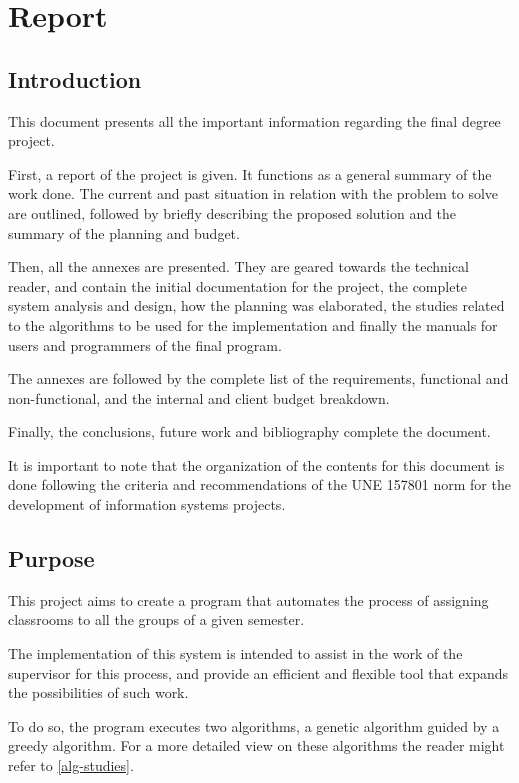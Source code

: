 \renewcommand{\documentname}{Report}

\chapter{Report}

\section{Introduction}

This document presents all the important information regarding the \tfg final degree project.

First, a report of the project is given. It functions as a general summary of the work done. The current and past situation in relation with the problem to solve are outlined, followed by briefly describing the proposed solution and the summary of the planning and budget.

Then, all the annexes are presented. They are geared towards the technical reader, and contain the initial documentation for the project, the complete system analysis and design, how the planning was elaborated, the studies related to the algorithms to be used for the implementation and finally the manuals for users and programmers of the final program.

The annexes are followed by the complete list of the requirements, functional and non-functional, and the internal and client budget breakdown.

Finally, the conclusions, future work and bibliography complete the document.

It is important to note that the organization of the contents for this document is done following the criteria and recommendations of the UNE 157801 norm for the development of information systems projects.

\section{Purpose}

This project aims to create a program that automates the process of assigning classrooms to all the groups of a given semester.

The implementation of this system is intended to assist in the work of the supervisor for this process, and provide an efficient and flexible tool that expands the possibilities of such work.

To do so, the program executes two algorithms, a genetic algorithm guided by a greedy algorithm. For a more detailed view on these algorithms the reader might refer to \ref{alg-studies}.

